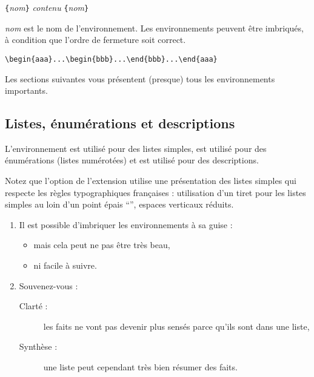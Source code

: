 \begin{lscommand}
\verb|{|\emph{nom}\verb|}|\quad
   \emph{contenu}\quad
{}\verb|{|\emph{nom}\verb|}|
\end{lscommand}
\noindent
\emph{nom} est le nom de l'environnement. Les environnements peuvent
être imbriqués, à condition que l'ordre de fermeture soit correct.
\begin{code}
\verb|\begin{aaa}...\begin{bbb}...\end{bbb}...\end{aaa}|
\end{code}
\noindent Les sections suivantes vous présentent (presque) tous les
environnements importants.

\subsection{Listes, énumérations et descriptions}

L'environnement  est utilisé pour des listes simples,
 est utilisé pour des énumérations (listes
numérotées) et  est utilisé pour des descriptions.


Notez que l'option  de l'extension  utilise
une présentation des
listes simples qui respecte les règles typographiques françaises : utilisation
d'un tiret pour les listes simples au loin d'un point épais \enquote{\textbullet},
espaces verticaux réduits.

\begin{example}
\begin{enumerate}
\item Il est possible d'imbriquer
les environnements à sa guise :
\begin{itemize}
\item mais cela peut ne pas
  être  très beau,
\item ni facile à suivre.
\end{itemize}
\item Souvenez-vous :
\begin{description}
\item[Clarté :] les faits ne
vont pas devenir plus sensés
parce  qu'ils sont dans une liste,
\item[Synthèse :] une liste peut
cependant très bien
résumer des faits.
\end{description}
\end{enumerate}
\end{example}

